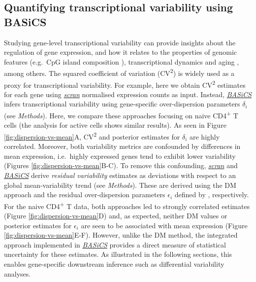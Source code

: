 \documentclass[9pt,a4paper,]{extarticle}
\begin{document}
\hypertarget{quantifying-transcriptional-variability-using-basics}{%
\subsection{Quantifying transcriptional variability using BASiCS}\label{quantifying-transcriptional-variability-using-basics}}

Studying gene-level transcriptional variability can provide insights about the
regulation of gene expression, and how it relates to the properties of genomic
features (e.g.~CpG island composition \citep{Morgan2018}), transcriptional dynamics
\citep{Antolovic2017} and aging \citep{Martinez-jimenez2017}, among others.
The squared coefficient of variation (CV\textsuperscript{2}) is widely used as a proxy for
transcriptional variability.
For example, here we obtain CV\textsuperscript{2} estimates for each gene using
\emph{\href{https://bioconductor.org/packages/3.11/scran}{scran}} normalised expression counts as input.
Instead, \emph{\href{https://bioconductor.org/packages/3.11/BASiCS}{BASiCS}} infers transcriptional variability using
gene-specific over-dispersion parameters \(\delta_i\) (see \emph{Methods}).
Here, we compare these approaches focusing on naive CD4\textsuperscript{+} T cells (the
analysis for active cells shows similar results).
As seen in Figure \ref{fig:dispersion-vs-mean}A, CV\textsuperscript{2} and posterior estimates
for \(\delta_i\) are highly correlated.
Moreover, both variability metrics are confounded by differences in mean
expression, i.e.~highly expressed genes tend to exhibit lower variability
(Figures \ref{fig:dispersion-vs-mean}B-C).
To remove this confounding, \emph{\href{https://bioconductor.org/packages/3.11/scran}{scran}} and \emph{\href{https://bioconductor.org/packages/3.11/BASiCS}{BASiCS}}
derive \emph{residual variability} estimates as deviations with respect to an
global mean-variability trend (see \emph{Methods}).
These are derived using the DM approach \citep{Kolodziejczyk2015cell} and the
residual over-dispersion parameters \(\epsilon_i\) defined by \citep{Eling2018},
respectively.
For the naive CD4\textsuperscript{+} T data, both approaches led to strongly correlated
estimates (Figure \ref{fig:dispersion-vs-mean}D) and, as expected, neither DM
values or posterior estimates for \(\epsilon_i\) are seen to be associated with
mean expression (Figure \ref{fig:dispersion-vs-mean}E-F).
However, unlike the DM method, the integrated approach implemented in
\emph{\href{https://bioconductor.org/packages/3.11/BASiCS}{BASiCS}} provides a direct measure of statistical uncertainty for
these estimates.
As illustrated in the following sections, this enables gene-specific
downstream inference such as differential variability analyses.
\end{document}
